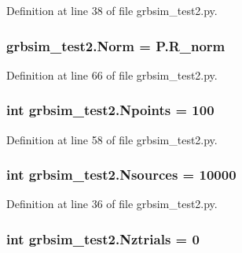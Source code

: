 Definition at line 38 of file grbsim\-\_\-test2.\-py.

\hypertarget{namespacegrbsim__test2_a1ed80b3823c02db556f19f345e0a323d}{
\subsubsection[{Norm}]{\setlength{\rightskip}{0pt plus 5cm}grbsim\-\_\-test2.\-Norm = P.\-R\-\_\-norm}}\label{namespacegrbsim__test2_a1ed80b3823c02db556f19f345e0a323d}


Definition at line 66 of file grbsim\-\_\-test2.\-py.

\hypertarget{namespacegrbsim__test2_a189373bc9fb066e8b9cb32bde08b6303}{
\subsubsection[{Npoints}]{\setlength{\rightskip}{0pt plus 5cm}int grbsim\-\_\-test2.\-Npoints = 100}}\label{namespacegrbsim__test2_a189373bc9fb066e8b9cb32bde08b6303}


Definition at line 58 of file grbsim\-\_\-test2.\-py.

\hypertarget{namespacegrbsim__test2_a54ecb545b55707213e4268f70d92c8dc}{
\subsubsection[{Nsources}]{\setlength{\rightskip}{0pt plus 5cm}int grbsim\-\_\-test2.\-Nsources = 10000}}\label{namespacegrbsim__test2_a54ecb545b55707213e4268f70d92c8dc}


Definition at line 36 of file grbsim\-\_\-test2.\-py.

\hypertarget{namespacegrbsim__test2_a114468d7823684eb193364d66b2b75dc}{
\subsubsection[{Nztrials}]{\setlength{\rightskip}{0pt plus 5cm}int grbsim\-\_\-test2.\-Nztrials = 0}}\label{namespacegrbsim__test2_a114468d7823684eb193364d66b2b75dc}



